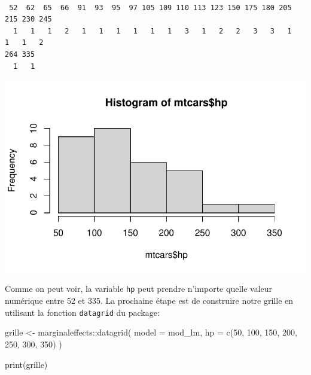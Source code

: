 \documentclass[
  letterpaper,
  DIV=11,
  numbers=noendperiod]{scrreprt}
\newenvironment{Shaded}{\begin{snugshade}}{\end{snugshade}}
\newcommand{\AttributeTok}[1]{\textcolor[rgb]{0.40,0.45,0.13}{#1}}
\newcommand{\DecValTok}[1]{\textcolor[rgb]{0.68,0.00,0.00}{#1}}
\newcommand{\FunctionTok}[1]{\textcolor[rgb]{0.28,0.35,0.67}{#1}}
\newcommand{\NormalTok}[1]{\textcolor[rgb]{0.00,0.23,0.31}{#1}}
\newcommand{\OtherTok}[1]{\textcolor[rgb]{0.00,0.23,0.31}{#1}}
\newcommand{\SpecialCharTok}[1]{\textcolor[rgb]{0.37,0.37,0.37}{#1}}
\begin{document}
\begin{verbatim}

 52  62  65  66  91  93  95  97 105 109 110 113 123 150 175 180 205 215 230 245 
  1   1   1   2   1   1   1   1   1   1   3   1   2   2   3   3   1   1   1   2 
264 335 
  1   1 
\end{verbatim}

\begin{Shaded}
\end{Shaded}

\includegraphics{chapitre_6_files/figure-pdf/unnamed-chunk-9-1.pdf}

Comme on peut voir, la variable \texttt{hp} peut prendre n'importe
quelle valeur numérique entre 52 et 335. La prochaine étape est de
construire notre grille en utilisant la fonction \texttt{datagrid} du
package:

\begin{Shaded}
\begin{Highlighting}[]
\NormalTok{grille }\OtherTok{\textless{}{-}}\NormalTok{ marginaleffects}\SpecialCharTok{::}\FunctionTok{datagrid}\NormalTok{(}
      \AttributeTok{model =}\NormalTok{ mod\_lm,}
      \AttributeTok{hp =} \FunctionTok{c}\NormalTok{(}\DecValTok{50}\NormalTok{, }\DecValTok{100}\NormalTok{, }\DecValTok{150}\NormalTok{, }\DecValTok{200}\NormalTok{, }\DecValTok{250}\NormalTok{, }\DecValTok{300}\NormalTok{, }\DecValTok{350}\NormalTok{)}
\NormalTok{)}

\FunctionTok{print}\NormalTok{(grille)}
\end{Highlighting}
\end{Shaded}
\end{document}
